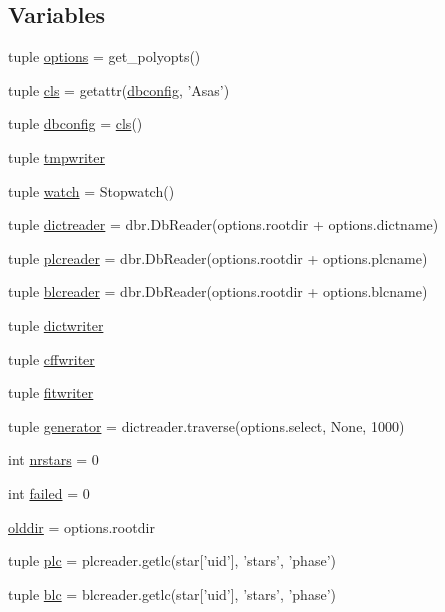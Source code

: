 \subsection*{Variables}
\begin{DoxyCompactItemize}
\item 
tuple \hyperlink{namespacerunpoly_acec78b48a294e8aafeff4c1745e761b4}{options} = get\_\-polyopts()
\item 
tuple \hyperlink{namespacerunpoly_ae53c9938e3373cc687af5896e211fcc4}{cls} = getattr(\hyperlink{namespacerunpoly_a23238d44f53fedb2335ddfd9e0ba563a}{dbconfig}, 'Asas')
\item 
tuple \hyperlink{namespacerunpoly_a23238d44f53fedb2335ddfd9e0ba563a}{dbconfig} = \hyperlink{namespacerunpoly_ae53c9938e3373cc687af5896e211fcc4}{cls}()
\item 
tuple \hyperlink{namespacerunpoly_ac9f61a81e4f1d37afe226eb29a552c68}{tmpwriter}
\item 
tuple \hyperlink{namespacerunpoly_ac573a8d4d7a1ebbf405bd0b69fa9361b}{watch} = Stopwatch()
\item 
tuple \hyperlink{namespacerunpoly_a41be213241b93ac1aaaf0a0dcd1818f2}{dictreader} = dbr.DbReader(options.rootdir + options.dictname)
\item 
tuple \hyperlink{namespacerunpoly_afb96306fccc8888ba0c85e13ab7a5598}{plcreader} = dbr.DbReader(options.rootdir + options.plcname)
\item 
tuple \hyperlink{namespacerunpoly_ac06d4b8419f2f541233264830433e74d}{blcreader} = dbr.DbReader(options.rootdir + options.blcname)
\item 
tuple \hyperlink{namespacerunpoly_a09493fdc135109309376e8ac388a3fde}{dictwriter}
\item 
tuple \hyperlink{namespacerunpoly_a19b081e3078cf18f986b0d40995ddd86}{cffwriter}
\item 
tuple \hyperlink{namespacerunpoly_a270c35c20bdd6aa659cab1358e8f9475}{fitwriter}
\item 
tuple \hyperlink{namespacerunpoly_a66f644ff5f02e8d9724a514873ac1be4}{generator} = dictreader.traverse(options.select, None, 1000)
\item 
int \hyperlink{namespacerunpoly_aa86a45877f78f52e3357c19a9221feed}{nrstars} = 0
\item 
int \hyperlink{namespacerunpoly_a77eea5c10faa8e40af7173ac7eda3478}{failed} = 0
\item 
\hyperlink{namespacerunpoly_a429eb81cafed3ca14e2465cbd91d3224}{olddir} = options.rootdir
\item 
tuple \hyperlink{namespacerunpoly_a079d0116a1dcdb50fd810307fa37f4b4}{plc} = plcreader.getlc(star\mbox{[}'uid'\mbox{]}, 'stars', 'phase')
\item 
tuple \hyperlink{namespacerunpoly_ae215f3ab3bd79ffc8502386a8e0ca6c6}{blc} = blcreader.getlc(star\mbox{[}'uid'\mbox{]}, 'stars', 'phase')
\end{DoxyCompactItemize}


